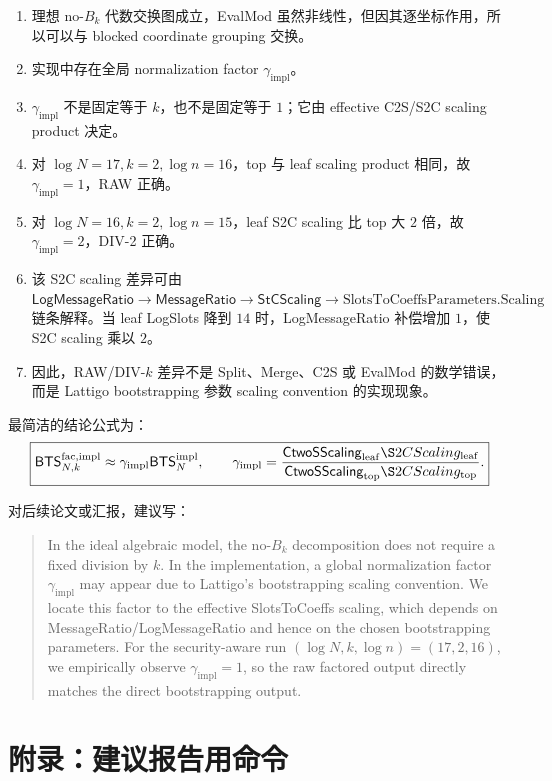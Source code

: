 \documentclass[UTF8,a4paper,11pt]{ctexart}
\newcommand{\BTS}{\mathsf{BTS}}
\newcommand{\LogMessageRatio}{\mathsf{LogMessageRatio}}
\newcommand{\MessageRatio}{\mathsf{MessageRatio}}
\newcommand{\StCScaling}{\mathsf{StCScaling}}
\newcommand{\CtwoSScaling}{\mathsf{CtwoSScaling}}
\begin{document}
\begin{enumerate}[leftmargin=2em]
\item 理想 no-$B_k$ 代数交换图成立，EvalMod 虽然非线性，但因其逐坐标作用，所以可以与 blocked coordinate grouping 交换。
\item 实现中存在全局 normalization factor $\gamma_{\mathrm{impl}}$。
\item $\gamma_{\mathrm{impl}}$ 不是固定等于 $k$，也不是固定等于 $1$；它由 effective C2S/S2C scaling product 决定。
\item 对 $\log N=17,k=2,\log n=16$，top 与 leaf scaling product 相同，故 $\gamma_{\mathrm{impl}}=1$，RAW 正确。
\item 对 $\log N=16,k=2,\log n=15$，leaf S2C scaling 比 top 大 $2$ 倍，故 $\gamma_{\mathrm{impl}}=2$，DIV-2 正确。
\item 该 S2C scaling 差异可由 $\LogMessageRatio\to\MessageRatio\to\StCScaling\to\mathrm{SlotsToCoeffsParameters.Scaling}$ 链条解释。当 leaf LogSlots 降到 $14$ 时，LogMessageRatio 补偿增加 $1$，使 S2C scaling 乘以 $2$。
\item 因此，RAW/DIV-$k$ 差异不是 Split、Merge、C2S 或 EvalMod 的数学错误，而是 Lattigo bootstrapping 参数 scaling convention 的实现现象。
\end{enumerate}

最简洁的结论公式为：
\begin{equation}
\boxed{
\BTS_{N,k}^{\mathrm{fac,impl}}
\approx
\gamma_{\mathrm{impl}}\BTS_N^{\mathrm{impl}},
\qquad
\gamma_{\mathrm{impl}}
=
\frac{
\CtwoSScaling_{\mathrm{leaf}}\S2CScaling_{\mathrm{leaf}}
}{
\CtwoSScaling_{\mathrm{top}}\S2CScaling_{\mathrm{top}}
}.
}
\end{equation}

对后续论文或汇报，建议写：
\begin{quote}
In the ideal algebraic model, the no-$B_k$ decomposition does not require a fixed division by $k$. In the implementation, a global normalization factor $\gamma_{\mathrm{impl}}$ may appear due to Lattigo's bootstrapping scaling convention. We locate this factor to the effective SlotsToCoeffs scaling, which depends on MessageRatio/LogMessageRatio and hence on the chosen bootstrapping parameters. For the security-aware run $(\log N,k,\log n)=(17,2,16)$, we empirically observe $\gamma_{\mathrm{impl}}=1$, so the raw factored output directly matches the direct bootstrapping output.
\end{quote}

\appendix
\section{附录：建议报告用命令}
\end{document}
